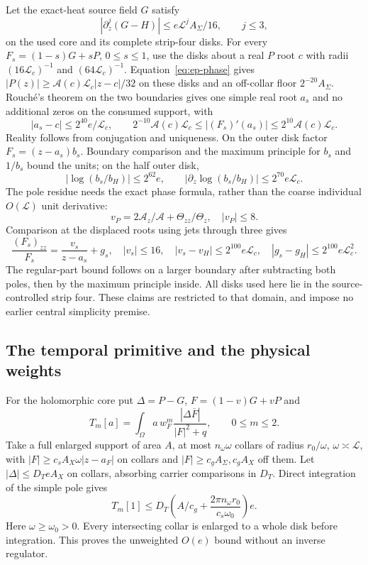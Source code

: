 Let the exact-heat source field $G$ satisfy
\begin{equation}
 |\partial_z^j(G-H)|\le e\mathcal L^j A_\Sigma/16,
 \qquad j\le3,
 \label{eq:ep-source-premise}
\end{equation}
on the used core and its complete strip-four disks. For every
$F_s=(1-s)G+sP$, $0\le s\le1$, use the disks about a real $P$ root
$c$ with radii $(16\mathcal L_c)^{-1}$ and
$(64\mathcal L_c)^{-1}$. Equation~\eqref{eq:ep-phase} gives
$|P(z)|\ge\mathcal A(c)\mathcal L_c|z-c|/32$ on these disks
and an off-collar floor $2^{-20}A_\Sigma$.
Rouch\'e's theorem on the two boundaries gives one simple real root
$a_s$ and no additional zeros on the consumed support, with
\[
 |a_s-c|\le2^{40}e/\mathcal L_c,\qquad
 2^{-10}\mathcal A(c)\mathcal L_c
 \le |(F_s)'(a_s)|\le2^{10}\mathcal A(c)\mathcal L_c.
\]
Reality follows from conjugation and uniqueness. On the outer disk
factor $F_s=(z-a_s)b_s$. Boundary comparison and the maximum principle
for $b_s$ and $1/b_s$ bound the units; on the half outer disk,
\[
 |\log(b_s/b_H)|\le2^{62}e,\qquad
 |\partial_z\log(b_s/b_H)|\le2^{70}e\mathcal L_c.
\]
The pole residue needs the exact phase formula, rather than the coarse
individual $O(\mathcal L)$ unit derivative:
\[
 v_P=2\mathcal A_z/\mathcal A+\Theta_{zz}/\Theta_z,\quad |v_P|\le8.
\]
Comparison at the displaced roots using jets through three gives
\begin{equation}
 \frac{(F_s)_{zz}}{F_s}=\frac{v_s}{z-a_s}+g_s,\quad
 |v_s|\le16,\quad |v_s-v_H|\le2^{100}e\mathcal L_c,
 \quad |g_s-g_H|\le2^{100}e\mathcal L_c^2.
 \label{eq:ep-poles}
\end{equation}
The regular-part bound follows on a larger boundary after subtracting
both poles, then by the maximum principle inside. All disks used here
lie in the source-controlled strip four. These claims are restricted to
that domain, and impose no earlier central simplicity premise.

\subsection{The temporal primitive and the physical weights}
For the holomorphic core put $\Delta=P-G$, $F=(1-v)G+vP$ and
\[
 T_m[a]=\int_\Omega a\,w_F^m
                 \frac{|\Delta\overline F|}{|F|^2+q},\qquad 0\le m\le2.
\]
Take a full enlarged support of area $A$, at most $n_\omega\omega$
collars of radius $r_0/\omega$, $\omega\asymp\mathcal L$, with
$|F|\ge c_s A_X\omega|z-a_F|$ on collars and
$|F|\ge c_g A_\Sigma,c_g A_X$ off them. Let
$|\Delta|\le D_T e A_X$ on collars, absorbing carrier comparisons in
$D_T$. Direct integration of the simple pole gives
\begin{equation}
 T_m[1]\le D_T\left(A/c_g+
              \frac{2\pi n_\omega r_0}{c_s\omega_0}\right)e.
 \label{eq:ep-temporal-primitive}
\end{equation}
Here $\omega\ge\omega_0>0$. Every intersecting collar is enlarged to a
whole disk before integration. This proves the unweighted $O(e)$ bound
without an inverse regulator.

